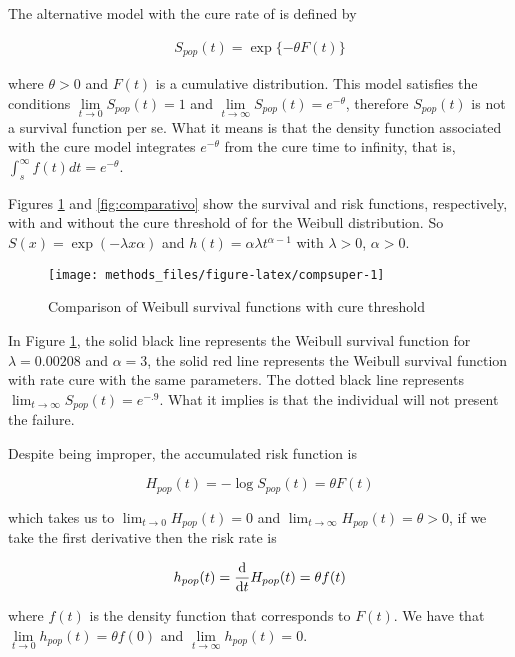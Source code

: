 \documentclass[
]{article}
\begin{document}
The alternative model with the cure rate of \citet{Hoang1996a} is
defined by

\begin{align} \label{supalter}
S_{pop}(t)=\exp\{-\theta F(t)\}
\end{align}

where \(\theta > 0\) and \(F (t)\) is a cumulative distribution. This
model satisfies the conditions
\(\lim \limits_{t \to 0} S_{pop} (t) = 1\) and
\(\lim \limits_{t \to \infty} S_{pop} (t) = e^{-\theta}\), therefore
\(S_ {pop} (t)\) is not a survival function per se. What it means is
that the density function associated with the cure model integrates
\(e^{- \theta}\) from the cure time to infinity, that is,
\(\int_s ^ \infty f (t) dt = e^{- \theta}\).

Figures \ref{fig:compsuper} and \ref{fig:comparativo} show the survival
and risk functions, respectively, with and without the cure threshold of
\citet{Hoang1996a} for the Weibull distribution. So
\(S(x) = \exp (-\lambda x \alpha)\) and
\(h (t) = \alpha \lambda t^{\alpha - 1}\) with \(\lambda > 0\),
\(\alpha > 0\).

\begin{figure}[H]
\texttt{[image: methods\_files/figure-latex/compsuper-1]} \caption{Comparison of Weibull survival functions with cure threshold}\label{fig:compsuper}
\end{figure}

In Figure \ref{fig:compsuper}, the solid black line represents the
Weibull survival function for \(\lambda = 0.00208\) and \(\alpha = 3\),
the solid red line represents the Weibull survival function with rate
\citet{Hoang1996a} cure with the same parameters. The dotted black line
represents \(\lim_{t \to \infty} S_{pop} (t) = e^{-.9}\). What it
implies is that the individual will not present the failure.

Despite being improper, the accumulated risk function is

\[
H_{pop}(t)=-\log S_{pop}(t)=\theta F(t)
\]

which takes us to \(\lim_{t \to 0} H_{pop} (t) = 0\) and
\(\lim_ {t \to \infty} H_ {pop} (t) = \theta> 0\), if we take the first
derivative then the risk rate is

\[
h_{pop}(t)=\dv{}{t}H_{pop}(t)=\theta f(t)
\]

where \(f (t)\) is the density function that corresponds to \(F (t)\).
We have that \(\lim \limits_{t \to 0} h_ {pop} (t) = \theta f (0)\) and
\(\lim \limits_{t \to \infty} h_{pop} (t) = 0\).
\end{document}
